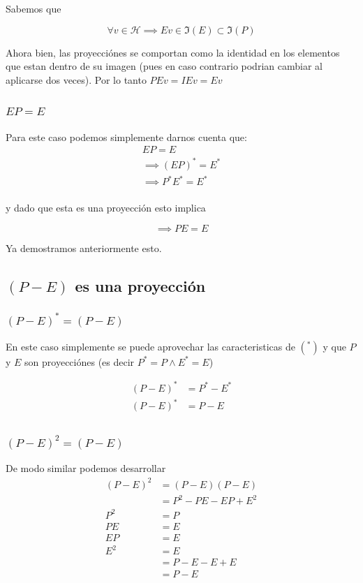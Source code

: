 \documentclass[12pt]{amsart}
\begin{document}
Sabemos que

$$\forall v \in \mathcal{H} \implies Ev \in \Im(E) \subset \Im(P)$$

Ahora bien, las proyecciónes se comportan como la identidad en los elementos que estan dentro de su imagen (pues en caso contrario podrian cambiar al aplicarse dos veces). Por lo tanto $PEv = IEv = Ev$

\subsubsection{$EP = E$}

Para este caso podemos simplemente darnos cuenta que:
\begin{align*}
  EP = E\\
  \implies \left(EP\right)^* = E^*\\
  \implies P^*E^* = E^*\\
\end{align*}

y dado que esta es una proyección esto implica

$$\implies PE = E$$

Ya demostramos anteriormente esto.

\subsection{$(P - E)$ es una proyección}

\subsubsection{$(P - E)^* = (P - E)$}

En este caso simplemente se puede aprovechar las caracteristicas de $(^*)$ y que $P$ y $E$ son proyecciónes (es decir $P^* = P \land E^* = E$)

\begin{align*}
  (P - E)^* &= P^* - E^*\\
  (P - E)^* &= P - E\\
\end{align*}

\subsubsection{$(P - E)^2 = (P - E)$}

De modo similar podemos desarrollar
\begin{align*}
  (P - E)^2 &= (P - E)(P - E)\\
  &= P^2 - PE - EP + E^2\\
  P^2 &= P\\
  PE &= E\\
  EP &= E\\
  E^2 &= E\\
  &= P - E - E + E\\
  &= P - E
\end{align*}
\end{document}
